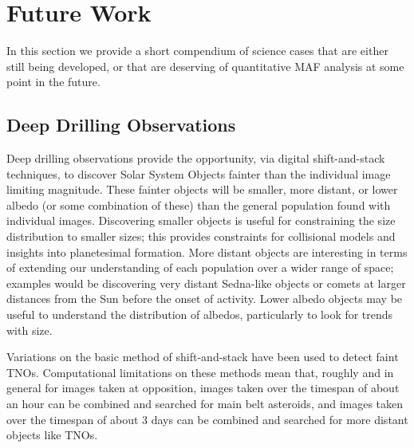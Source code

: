 %
%

\section{Future Work}
\def\secname{\chpname:future}\label{sec:\secname}

In this section we provide a short compendium of science cases that
are either still being developed, or that are deserving of quantitative
MAF analysis at some point in the future.

%
\subsection{Deep Drilling Observations}
\def\secname{\chpname:dd}\label{sec:\secname}

Deep drilling observations provide the opportunity, via digital
shift-and-stack techniques, to discover Solar System Objects fainter
than the individual image limiting magnitude. These fainter objects
will be smaller, more distant, or lower albedo (or some combination of these)
than the general population found with individual images. Discovering smaller
objects is useful for constraining the size distribution to smaller
sizes; this provides constraints for collisional models and insights
into planetesimal formation. More distant objects are interesting in
terms of extending our understanding of each population over a wider
range of space; examples would be discovering very distant
Sedna-like objects or comets at larger distances from the Sun before
the onset of activity. Lower albedo objects may be useful to
understand the distribution of albedos, particularly to look for
trends with size.

Variations on the basic method of shift-and-stack have been used to
detect faint TNOs.
Computational limitations on these methods mean that, roughly and in
general for images taken at opposition, images taken over the timespan
of about an hour can be combined and searched for main belt asteroids,
and images taken over the timespan of about 3 days can be combined and
searched for more distant objects like TNOs.

